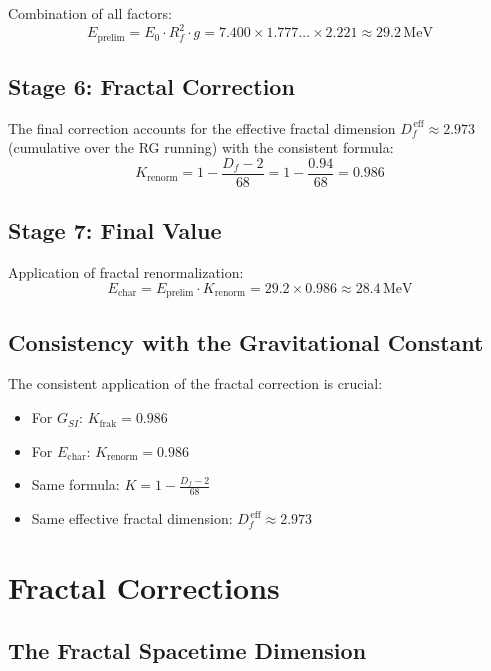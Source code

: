	Combination of all factors:
	\begin{equation}
		E_{\text{prelim}} = E_0 \cdot R_f^2 \cdot g = 7.400 \times 1.777\ldots \times 2.221 \approx 29.2\,\text{MeV}
	\end{equation}
	
	\subsection{Stage 6: Fractal Correction}
	
	The final correction accounts for the effective fractal dimension $D_f^{\,\text{eff}} \approx 2.973$ (cumulative over the RG running) with the consistent formula:
	\begin{equation}
		K_{\text{renorm}} = 1 - \frac{D_f - 2}{68} = 1 - \frac{0.94}{68} = 0.986
	\end{equation}
	
	\subsection{Stage 7: Final Value}
	
	Application of fractal renormalization:
	\begin{equation}
		E_{\text{char}} = E_{\text{prelim}} \cdot K_{\text{renorm}} = 29.2 \times 0.986 \approx 28.4\,\text{MeV}
	\end{equation}
	
	\subsection{Consistency with the Gravitational Constant}
	
	The consistent application of the fractal correction is crucial:
	\begin{itemize}
		\item For $G_{SI}$: $K_{\text{frak}} = 0.986$
		\item For $E_{\text{char}}$: $K_{\text{renorm}} = 0.986$
		\item Same formula: $K = 1 - \frac{D_f - 2}{68}$
		\item Same effective fractal dimension: $D_f^{\,\text{eff}} \approx 2.973$
	\end{itemize}
	
	\section{Fractal Corrections}
	
	\subsection{The Fractal Spacetime Dimension}
	
